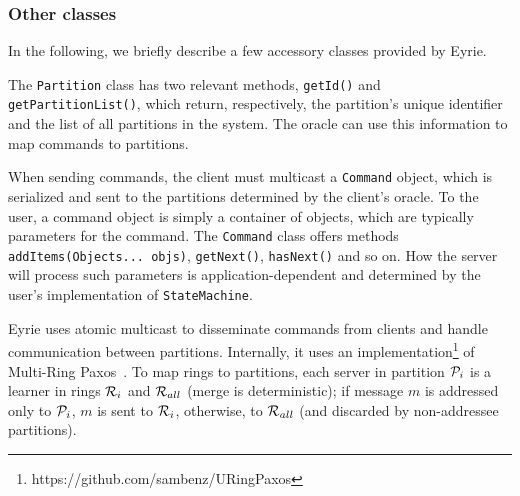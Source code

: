 \subsubsection{Other classes}
In the following, we briefly describe a few accessory classes provided by Eyrie.

The \verb#Partition# class %
has two relevant methods, \verb#getId()# and \verb#getPartitionList()#, which return, respectively, the partition's unique identifier and the list of all partitions in the system.
The oracle can use this information to map commands to partitions.

When sending commands, the client must multicast a \verb#Command# object, which is serialized and sent to the partitions determined by the client's oracle. To the user, a command object is simply a container of objects, which are typically parameters for the command. The \verb#Command# class offers methods \verb#addItems(Objects... objs)#, \verb#getNext()#, \verb#hasNext()# and so on. How the server will process such parameters is application-dependent and determined by %
the user's implementation of \verb#StateMachine#.

Eyrie uses atomic multicast to disseminate commands from clients and handle communication between partitions.
Internally, it uses an implementation\footnote{https://github.com/sambenz/URingPaxos} of Multi-Ring Paxos~\cite{MRPPROC2012}. To map rings to partitions, each server in partition $\mathcal{P}_i$ is a learner in rings $\mathcal{R}_i$ and $\mathcal{R}_{all}$ (merge is deterministic); if message $m$ is addressed only to $\mathcal{P}_i$, $m$ is sent to $\mathcal{R}_i$, otherwise, to $\mathcal{R}_{all}$ (and discarded by non-addressee partitions). 



